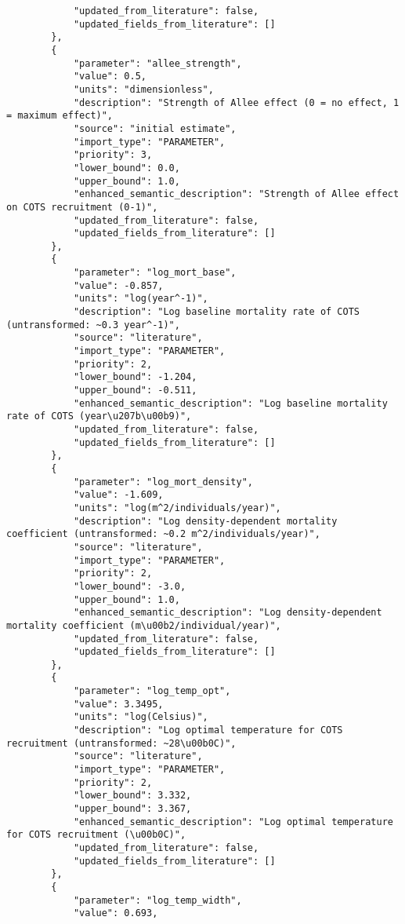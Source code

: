\begin{lstlisting}
            "updated_from_literature": false,
            "updated_fields_from_literature": []
        },
        {
            "parameter": "allee_strength",
            "value": 0.5,
            "units": "dimensionless",
            "description": "Strength of Allee effect (0 = no effect, 1 = maximum effect)",
            "source": "initial estimate",
            "import_type": "PARAMETER",
            "priority": 3,
            "lower_bound": 0.0,
            "upper_bound": 1.0,
            "enhanced_semantic_description": "Strength of Allee effect on COTS recruitment (0-1)",
            "updated_from_literature": false,
            "updated_fields_from_literature": []
        },
        {
            "parameter": "log_mort_base",
            "value": -0.857,
            "units": "log(year^-1)",
            "description": "Log baseline mortality rate of COTS (untransformed: ~0.3 year^-1)",
            "source": "literature",
            "import_type": "PARAMETER",
            "priority": 2,
            "lower_bound": -1.204,
            "upper_bound": -0.511,
            "enhanced_semantic_description": "Log baseline mortality rate of COTS (year\u207b\u00b9)",
            "updated_from_literature": false,
            "updated_fields_from_literature": []
        },
        {
            "parameter": "log_mort_density",
            "value": -1.609,
            "units": "log(m^2/individuals/year)",
            "description": "Log density-dependent mortality coefficient (untransformed: ~0.2 m^2/individuals/year)",
            "source": "literature",
            "import_type": "PARAMETER",
            "priority": 2,
            "lower_bound": -3.0,
            "upper_bound": 1.0,
            "enhanced_semantic_description": "Log density-dependent mortality coefficient (m\u00b2/individual/year)",
            "updated_from_literature": false,
            "updated_fields_from_literature": []
        },
        {
            "parameter": "log_temp_opt",
            "value": 3.3495,
            "units": "log(Celsius)",
            "description": "Log optimal temperature for COTS recruitment (untransformed: ~28\u00b0C)",
            "source": "literature",
            "import_type": "PARAMETER",
            "priority": 2,
            "lower_bound": 3.332,
            "upper_bound": 3.367,
            "enhanced_semantic_description": "Log optimal temperature for COTS recruitment (\u00b0C)",
            "updated_from_literature": false,
            "updated_fields_from_literature": []
        },
        {
            "parameter": "log_temp_width",
            "value": 0.693,

\end{lstlisting}

